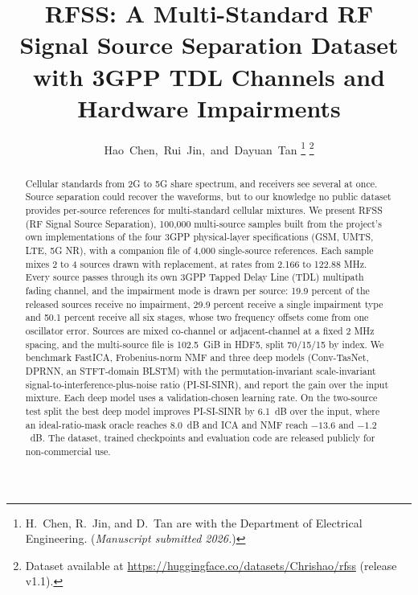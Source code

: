 \documentclass[journal]{IEEEtran}
\begin{document}
\title{RFSS: A Multi-Standard RF Signal Source Separation Dataset
with 3GPP TDL Channels and Hardware Impairments}

\author{Hao~Chen,~Rui~Jin,~and~Dayuan~Tan%
\thanks{H.~Chen, R.~Jin, and D.~Tan are with the Department of Electrical
Engineering. (\textit{Manuscript submitted 2026.})}%
\thanks{Dataset available at
\protect\url{https://huggingface.co/datasets/Chrishao/rfss} (release v1.1).}%
}

\maketitle

\begin{abstract}
Cellular standards from 2G to 5G share spectrum, and receivers see several at
once. Source separation could recover the waveforms, but to our knowledge no
public dataset provides per-source references for multi-standard cellular
mixtures. We present
RFSS (RF Signal Source Separation),
100,000 multi-source samples built from the project's own implementations of the
four 3GPP physical-layer specifications (GSM, UMTS, LTE, 5G NR), with
a companion file of 4,000 single-source references. Each sample mixes 2 to 4
sources drawn with replacement, at rates from 2.166 to 122.88 MHz. Every source
passes through its own 3GPP Tapped Delay Line (TDL) multipath fading channel, and
the impairment mode is drawn per source: 19.9 percent of the released sources
receive no impairment, 29.9 percent receive a single impairment type and
50.1 percent receive all six stages, whose two
frequency offsets come from one oscillator error. Sources are
mixed co-channel
or adjacent-channel at a fixed 2 MHz spacing, and the multi-source file is
102.5~GiB in HDF5, split 70/15/15 by index. We benchmark FastICA, Frobenius-norm NMF
and three deep models (Conv-TasNet, DPRNN, an STFT-domain BLSTM) with the
permutation-invariant scale-invariant
signal-to-interference-plus-noise ratio (PI-SI-SINR), and report the gain
over the input mixture. Each deep model uses a validation-chosen learning rate.
On the two-source test split the best deep model improves
PI-SI-SINR by 6.1~dB over the input, where an ideal-ratio-mask oracle reaches
8.0~dB and ICA and NMF reach $-13.6$ and $-1.2$~dB. The dataset, trained
checkpoints and evaluation code are released publicly for non-commercial use.
\end{abstract}
\end{document}
